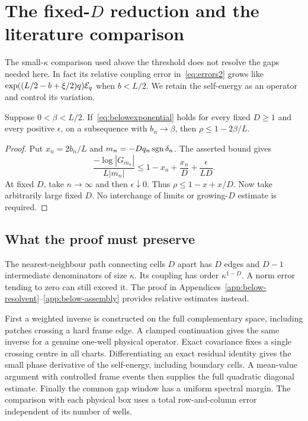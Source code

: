 \section[The fixed-D reduction and the literature comparison]{The fixed-$D$ reduction and the literature comparison}\label{sec:below}
The small-$\kappa$ comparison used above the threshold does not resolve the gaps needed here. In fact its relative coupling error in~\eqref{eq:errors2} grows like
$\exp((L/2-b+\xi/2)q)\mathcal E_q$ when $b<L/2$. We retain the self-energy as an operator and control its variation.

\begin{lemma}\label{lem:fixedD}
Suppose $0<\beta<L/2$. If~\eqref{eq:belowexponential} holds for every fixed $D\ge1$ and every positive $\epsilon$, on a subsequence with $b_n\to\beta$, then $\rho\le1-2\beta/L$.
\end{lemma}
\begin{proof}
Put $x_n=2b_n/L$ and $m_n=-Dq_n\operatorname{sgn}\delta_n$. The asserted bound gives
\[
 \frac{-\log|G_{m_n}|}{L|m_n|}
 \le 1-x_n+\frac{x_n}{D}+\frac{\epsilon}{LD}.
\]
At fixed $D$, take $n\to\infty$ and then $\epsilon\downarrow0$. Thus
$\rho\le1-x+x/D$. Now take arbitrarily large fixed $D$. No interchange of limits or growing-$D$ estimate is required.
\end{proof}

\subsection{What the proof must preserve}
The nearest-neighbour path connecting cells $D$ apart has $D$ edges and $D-1$ intermediate denominators of size $\kappa$. Its coupling has order $\kappa^{1-D}$. A norm error tending to zero can still exceed it. The proof in Appendices~\ref{app:below-resolvent}--\ref{app:below-assembly} provides relative estimates instead.

First a weighted inverse is constructed on the full complementary space, including patches crossing a hard frame edge. A clamped continuation gives the same inverse for a genuine one-well physical operator. Exact covariance fixes a single crossing centre in all charts. Differentiating an exact residual identity gives the small phase derivative of the self-energy, including boundary cells. A mean-value argument with controlled frame events then supplies the full quadratic diagonal estimate. Finally the common gap window has a uniform spectral margin. The comparison with each physical box uses a total row-and-column error independent of its number of wells.

